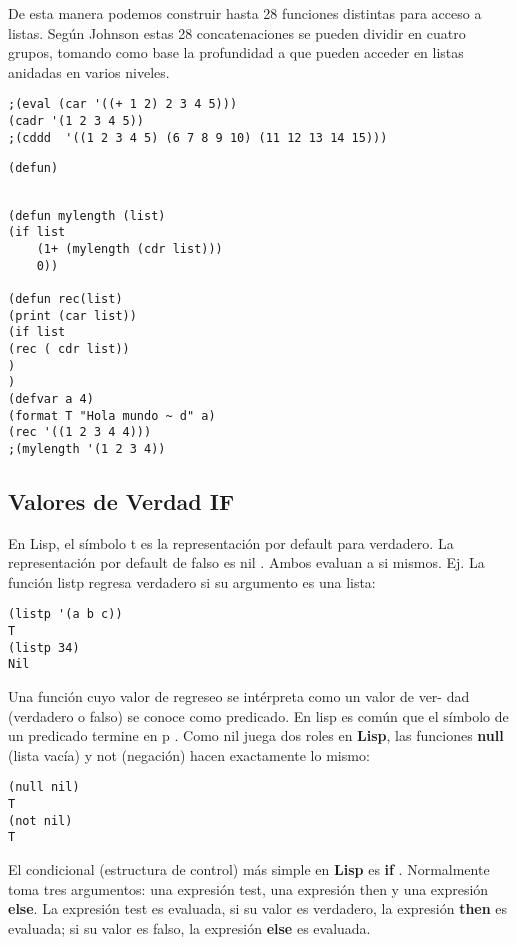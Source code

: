 \documentclass[11pt]{article}
\begin{document}
De esta manera podemos construir hasta 28 funciones distintas para acceso a
listas. Según Johnson estas 28 concatenaciones se pueden dividir en
cuatro grupos, tomando como base la profundidad a que pueden acceder
en listas anidadas en varios niveles.


\begin{verbatim}
;(eval (car '((+ 1 2) 2 3 4 5)))
(cadr '(1 2 3 4 5))
;(cddd  '((1 2 3 4 5) (6 7 8 9 10) (11 12 13 14 15)))

\end{verbatim}


\begin{verbatim}
(defun)


\end{verbatim}


\begin{verbatim}
(defun mylength (list)
(if list 
	(1+ (mylength (cdr list)))
	0))

(defun rec(list)
(print (car list))
(if list 
(rec ( cdr list))
)
)
(defvar a 4)
(format T "Hola mundo ~ d" a)
(rec '((1 2 3 4 4)))
;(mylength '(1 2 3 4))

\end{verbatim}


\subsection*{Valores de Verdad IF}
\label{sec:org642e34c}

En Lisp, el símbolo t es la representación por default para
verdadero. La representación por default de falso es nil . Ambos
evaluan a si mismos. Ej.  La función listp regresa verdadero si su
argumento es una lista:

\begin{verbatim}
(listp '(a b c))
T
(listp 34)
Nil
\end{verbatim}

Una función cuyo valor de regreseo se intérpreta como un valor de ver-
dad (verdadero o falso) se conoce como predicado. En lisp es común que
el símbolo de un predicado termine en p .  Como nil juega dos roles en
\textbf{Lisp}, las funciones \textbf{null} (lista vacía) y not (negación) hacen
exactamente lo mismo:


\begin{verbatim}
(null nil)
T
(not nil)
T
\end{verbatim}

El condicional (estructura de control) más simple en \textbf{Lisp} es \textbf{if}
. Normalmente toma tres argumentos: una expresión test, una expresión
then y una expresión \textbf{else}. La expresión test es evaluada, si su
valor es verdadero, la expresión \textbf{then} es evaluada; si su valor es
falso, la expresión \textbf{else} es evaluada.
\end{document}
